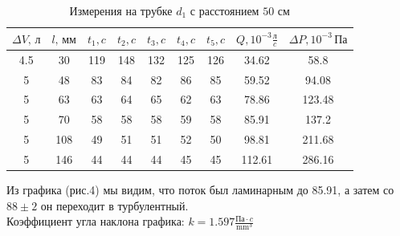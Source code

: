 \documentclass[a4paper, 12pt]{article}%
\begin{document}
\begin{table}[h]

	\centering
	\begin{tabular}{|c|c|c|c|c|c|c|c|c|} \hline
  $\Delta V, \, \text{л}$ &   $l,\, \text{мм}$ &     $t_1, c$ &     $t_2, c$ &     $t_3, c$ &     $t_4, c$ &     $t_5, c$&     $ Q, 10^{-3} \frac{\text{л}}{c} $ & $\Delta P, 10^{-3}\, \text{Па}$ \\\hline
 4.5 &30 &  119 & 148 & 132 &  125 & 126 & 34.62&  58.8 \\\hline
 5 &  48 &  83 &  84 &  82 &  86 &  85 &   59.52& 94.08 \\\hline
 5 &  63 &  63 &  64 &  65 &  62 &  63 &   78.86& 123.48 \\\hline
 5 &  70 &  58 &  58 &  58 &  59 &  58 &   85.91& 137.2   \\\hline
 5 &  108 & 49 &  51 &  51 &  52 &  50 &   98.81& 211.68   \\\hline
 5 &  146 & 44 &  44 &  44 &  45 &  45 &   112.61& 286.16    \\\hline
  
\end{tabular}
		\caption{Измерения на трубке $d_1$ с расстоянием $50$ см}
\end{table}


Из графика (рис.4) мы видим, что поток был ламинарным до 85.91, а затем со $88 \pm 2$ он переходит в турбулентный.\\
Коэффициент угла наклона графика: $k = 1.597 \frac{\text{Па} \cdot c}{\text{mm}^3}$
\end{document}
